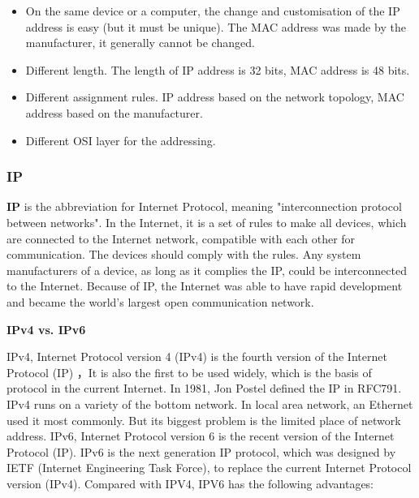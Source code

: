 \begin{itemize}
	\item On the same device or a computer, the change and customisation of the IP address is easy (but it must be unique). The MAC address was made by the manufacturer, it generally cannot be changed.
	\item Different length. The length of IP address is 32 bits, MAC address is 48 bits.
	\item Different assignment rules. IP address based on the network topology, MAC address based on the manufacturer.
	\item Different OSI layer for the addressing.
\end{itemize}

\subsubsection{IP}

\textbf{IP} is the abbreviation for Internet Protocol, meaning "interconnection protocol between networks". In the Internet, it is a set of rules to make all devices, which are connected to the Internet network, compatible with each other for communication. The devices should comply with the rules. Any system manufacturers of a device, as long as it complies the IP, could be interconnected to the Internet. Because of IP, the Internet was able to have rapid development and became the world's largest open communication network.  

\textbf{IPv4 vs. IPv6}

IPv4, Internet Protocol version 4 (IPv4) is the fourth version of the Internet Protocol (IP) ，It is also the first to be used widely, which is the basis of protocol in the current Internet. In 1981, Jon Postel defined the IP in RFC791.  
IPv4 runs on a variety of the bottom network. In local area network, an Ethernet used it most commonly. But its biggest problem is the limited place of network address.  
IPv6, Internet Protocol version 6 is the recent version of the Internet Protocol (IP). IPv6 is the next generation IP protocol, which was designed by IETF (Internet Engineering Task Force), to replace the current Internet Protocol version (IPv4).  
Compared with IPV4, IPV6 has the following advantages:  

